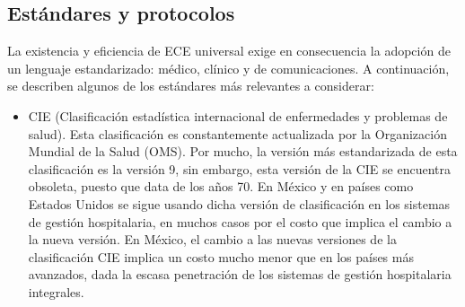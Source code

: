 \subsection{Estándares y protocolos}

La existencia y eficiencia de ECE universal exige en consecuencia la adopción de un lenguaje estandarizado: médico, clínico y de comunicaciones. A continuación, se describen algunos de los estándares más relevantes a considerar:
\begin{itemize}
  \item CIE (Clasificación estadística internacional de enfermedades y problemas de salud). Esta clasificación es constantemente actualizada por la Organización Mundial de la Salud (OMS). Por mucho, la versión más estandarizada de esta clasificación es la versión 9, sin embargo, esta versión de la CIE se encuentra obsoleta, puesto que data de los años 70. En México y en países como Estados Unidos se sigue usando dicha versión de clasificación en los sistemas de gestión hospitalaria, en muchos casos por el costo que implica el cambio a la nueva versión. En México, el cambio a las nuevas versiones de la clasificación CIE implica un costo mucho menor que en los países más avanzados, dada la escasa penetración de los sistemas de gestión hospitalaria integrales. \cite{marco2}


\end{itemize}
